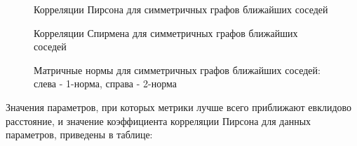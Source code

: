 \begin{figure}[h]
  \begin{minipage}[h]{0.49\linewidth}
  \end{minipage}
  \hfill
  \begin{minipage}[h]{0.49\linewidth}
  \end{minipage}

  \caption{Корреляции Пирсона для симметричных графов ближайших соседей}
  \label{img:sym_graphs}  
\end{figure}

\begin{figure}[h]
  \begin{minipage}[h]{0.49\linewidth}
  \end{minipage}
  \hfill
  \begin{minipage}[h]{0.49\linewidth}
  \end{minipage}

  \caption{Корреляции Спирмена для симметричных графов ближайших соседей}
  \label{img:sym_graphs_sp}  
\end{figure}


\begin{figure}[h]
  \begin{minipage}[h]{0.49\linewidth}
  \end{minipage}
  \hfill
  \begin{minipage}[h]{0.49\linewidth}
  \end{minipage}

  \caption{Матричные нормы для симметричных графов ближайших соседей: слева - 1-норма, справа - 2-норма}
  \label{img:sym_graphs_norm}  
\end{figure}



\newpage
 Значения параметров, при которых метрики лучше всего приближают евклидово расстояние, и значение коэффициента корреляции Пирсона для данных параметров, приведены в таблице:

